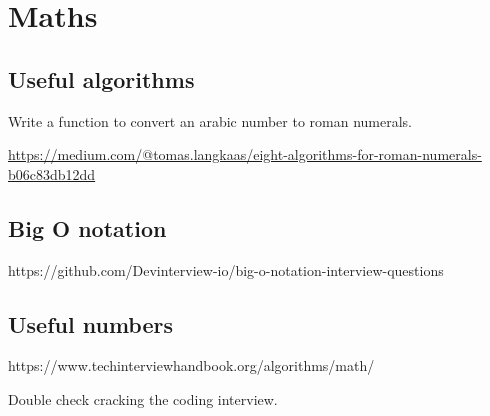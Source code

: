 \section{Maths}

\subsection{Useful algorithms}

\begin{questions}

\question Write a function to convert an arabic number to roman numerals.
\begin{solution}
\url{https://medium.com/@tomas.langkaas/eight-algorithms-for-roman-numerals-b06c83db12dd}
\end{solution}

\end{questions}

\subsection{Big O notation}

https://github.com/Devinterview-io/big-o-notation-interview-questions

\subsection{Useful numbers}

https://www.techinterviewhandbook.org/algorithms/math/

Double check cracking the coding interview.
